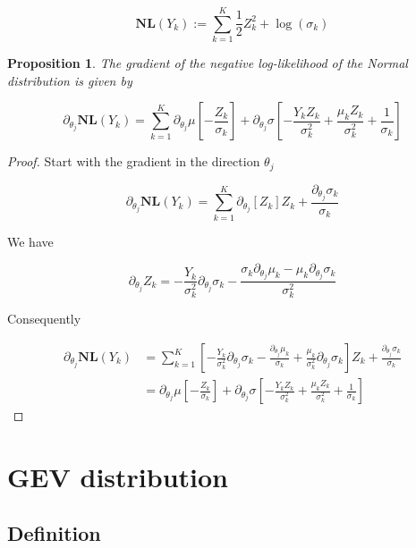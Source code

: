 \documentclass[12pt,a4paper]{article}
\theoremstyle{plain}
\newtheorem{proposition}[theorem]{Proposition}
\theoremstyle{definition}
\theoremstyle{remark}
\newcommand{\NL}{\mathbf{NL}}
\begin{document}
\[\NL(Y_k):=\sum_{k=1}^K
\frac{1}{2}Z_k^2 + \log(\sigma_k)\]

\begin{proposition} The gradient of the negative log-likelihood of the Normal
distribution is given by

\[
\partial_{\theta_j}\NL(Y_k)=\sum_{k=1}^K
\partial_{\theta_j}\mu\left[-\frac{Z_k}{\sigma_k}\right] +
\partial_{\theta_j}\sigma\left[-\frac{Y_kZ_k}{\sigma_k^2}+\frac{\mu_kZ_k}{\sigma_k^2}+\frac{1}{\sigma_k}\right]
\]

\end{proposition}

\begin{proof} Start with the gradient in the direction $\theta_j$

\[
\partial_{\theta_j}\NL(Y_k)=\sum_{k=1}^K \partial_{\theta_j}\left[ Z_k\right] Z_k +
\frac{\partial_{\theta_j}\sigma_k}{\sigma_k}
\]

\noindent We have

\[
\partial_{\theta_j}Z_k = - \frac{Y_k}{\sigma_k^2}\partial_{\theta_j}\sigma_k -
\frac{\sigma_k\partial_{\theta_j}\mu_k-\mu_k\partial_{\theta_j}\sigma_k}{\sigma_k^2}
\]

\noindent Consequently

\[
\begin{aligned}
\partial_{\theta_j}\NL(Y_k) &= \sum_{k=1}^K
\left[ - \frac{Y_k}{\sigma_k^2}\partial_{\theta_j}\sigma_k - \frac{\partial_{\theta_j}\mu_k}{\sigma_k} + \frac{\mu_k}{\sigma_k^2}\partial_{\theta_j}\sigma_k\right] Z_k +
\frac{\partial_{\theta_j}\sigma_k}{\sigma_k}\\
&= \partial_{\theta_j}\mu\left[-\frac{Z_k}{\sigma_k}\right] +
\partial_{\theta_j}\sigma\left[-\frac{Y_kZ_k}{\sigma_k^2}+\frac{\mu_kZ_k}{\sigma_k^2}+\frac{1}{\sigma_k}\right]
\end{aligned}
\]

\end{proof}



\section{GEV distribution} %


\subsection{Definition} %
\end{document}
